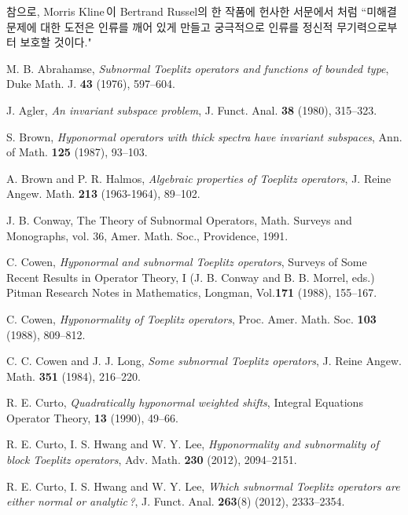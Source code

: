 \documentclass[12pt,a4paper,2sided]{article}
\begin{document}
\newpage
{}

\vspace{0.8cm}

참으로, Morris Kline\,이 Bertrand Russel의 한 작품에 헌사한 서문에서
처럼 ``미해결 문제에 대한 도전은 인류를 깨어 있게 만들고 궁극적으로
인류를 정신적 무기력으로부터 보호할 것이다."



\begin{thebibliography}{99}\footnotesize


 M. B. Abrahamse,
{\it Subnormal Toeplitz operators and functions of bounded type},
Duke Math. J. {\bf 43} (1976), 597--604.

 J. Agler, {\it An invariant subspace problem}, J. Funct. Anal.
{\bf 38} (1980), 315--323.

 S. Brown, {\it Hyponormal operators with thick spectra have invariant subspaces},
Ann. of Math. {\bf 125} (1987), 93--103.

 A. Brown and P. R. Halmos, {\it Algebraic properties of Toeplitz operators},
J. Reine Angew. Math. {\bf 213} (1963-1964), 89--102.


 J. B. Conway, The Theory of Subnormal Operators,
Math. Surveys and Monographs, vol. 36, Amer. Math. Soc., Providence, 1991.


 C. Cowen, {\it Hyponormal and subnormal Toeplitz operators},
Surveys of Some Recent Results in Operator Theory, I (J. B. Conway
and B. B. Morrel, eds.) Pitman Research Notes in Mathematics,
Longman, Vol.{\bf 171} (1988), 155--167.

 C. Cowen, {\it Hyponormality of Toeplitz operators}, Proc. Amer. Math. Soc.
{\bf 103} (1988), 809--812.

 C. C. Cowen and J. J. Long, {\it Some subnormal Toeplitz operators},
J. Reine Angew. Math. {\bf 351} (1984), 216--220.

 R. E. Curto, {\it Quadratically hyponormal weighted shifts},
Integral Equations Operator Theory, {\bf 13} (1990), 49--66.

R. E. Curto, I. S. Hwang and W. Y. Lee,
{\it Hyponormality and subnormality of block Toeplitz operators},
Adv. Math. {\bf 230} (2012), 2094--2151.


  R. E. Curto, I. S. Hwang and W. Y. Lee,
{\it Which subnormal Toeplitz operators are either normal or
analytic\,?}, J. Funct. Anal. {\bf 263}(8) (2012), 2333--2354.



\end{thebibliography}
\end{document}
